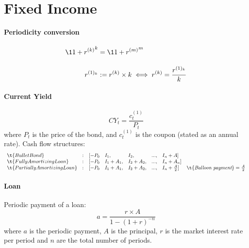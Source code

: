 \documentclass[12pt,article]{memoir}
\begin{document}

\chapter{Fixed Income}

\subsubsection{Periodicity conversion}
\begin{align*}
\1{1+r^{(k)}}^k &= \1{1+r^{(m)}}^m 
\\[1em]
r^{(1)_k} &:= r^{(k)}\times k \iff r^{(k)} = \frac{r^{(1)_k}}{k}
\end{align*}

\subsubsection{Current Yield}
$$CY_t = \frac{c^{(1)}_t}{P_t}$$
where $P_t$ is the price of the bond, and $c^{(1)}_t$ is the coupon (stated as an annual rate).
Cash flow structures: 
$$\begin{array}{llllllll}
\t{Bullet Bond} & : & [-P_0 & I_1, & I_2, &..., &I_n + A]
\\ 
\t{Fully Amortizing Loan} &:& [-P_0 & I_1+A_1, &I_2+A_2, &..., & I_n+A_n]
\\
\t{Partially Amortizing Loan} &:& [-P_0 & I_1+A_1, &I_2+A_2, &..., & I_n+\frac{A}{2}] & \t{\textit{Balloon payment}}=\frac{A}{2}
\end{array}$$
\subsubsection{Loan}
Periodic payment of a loan: 
$$
a = \frac{r \times A}{1-(1+r)^{-n}}
$$
where $a$ is the periodic payment, $A$ is the principal, $r$ is the market interest rate per period and $n$ are the total number of periods.
\end{document}
